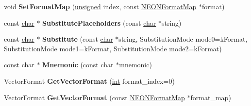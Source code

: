 \begin{DoxyCompactItemize}
\item 
\mbox{\label{classv8_1_1internal_1_1NEONFormatDecoder_a09f25e615c37c3d6425b999c9d787089}} 
void {\bfseries Set\+Format\+Map} (\mbox{\hyperlink{classunsigned}{unsigned}} index, const \mbox{\hyperlink{structv8_1_1internal_1_1NEONFormatMap}{N\+E\+O\+N\+Format\+Map}} $\ast$format)
\item 
\mbox{\label{classv8_1_1internal_1_1NEONFormatDecoder_ae1d7850f870c3e9c1fd322e15dbdc784}} 
const \mbox{\hyperlink{classchar}{char}} $\ast$ {\bfseries Substitute\+Placeholders} (const \mbox{\hyperlink{classchar}{char}} $\ast$string)
\item 
\mbox{\label{classv8_1_1internal_1_1NEONFormatDecoder_a58fa805178e6c1fc7bdbe10701345137}} 
const \mbox{\hyperlink{classchar}{char}} $\ast$ {\bfseries Substitute} (const \mbox{\hyperlink{classchar}{char}} $\ast$string, Substitution\+Mode mode0=k\+Format, Substitution\+Mode mode1=k\+Format, Substitution\+Mode mode2=k\+Format)
\item 
\mbox{\label{classv8_1_1internal_1_1NEONFormatDecoder_a67dde15de21fb376eb20b943a900ad3e}} 
const \mbox{\hyperlink{classchar}{char}} $\ast$ {\bfseries Mnemonic} (const \mbox{\hyperlink{classchar}{char}} $\ast$mnemonic)
\item 
\mbox{\label{classv8_1_1internal_1_1NEONFormatDecoder_a10272e5fd50e63ddfc01d9fb92d595da}} 
Vector\+Format {\bfseries Get\+Vector\+Format} (\mbox{\hyperlink{classint}{int}} format\+\_\+index=0)
\item 
\mbox{\label{classv8_1_1internal_1_1NEONFormatDecoder_a5848a6c12820630cf1f670d8b81eb2dd}} 
Vector\+Format {\bfseries Get\+Vector\+Format} (const \mbox{\hyperlink{structv8_1_1internal_1_1NEONFormatMap}{N\+E\+O\+N\+Format\+Map}} $\ast$format\+\_\+map)
\end{DoxyCompactItemize}
